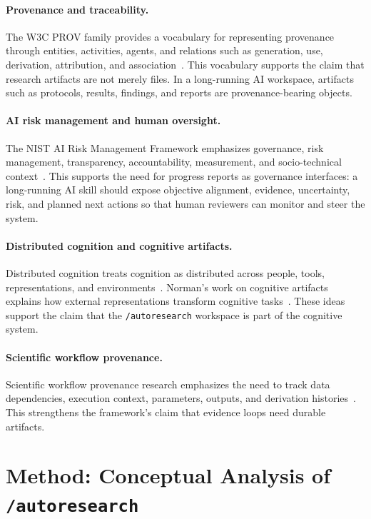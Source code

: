 \documentclass[11pt]{article}
\begin{document}
\paragraph{Provenance and traceability.}
The W3C PROV family provides a vocabulary for representing provenance through entities, activities, agents, and relations such as generation, use, derivation, attribution, and association~\cite{w3cprov2013overview,w3cprov2013dm,w3cprov2013o}. This vocabulary supports the claim that research artifacts are not merely files. In a long-running AI workspace, artifacts such as protocols, results, findings, and reports are provenance-bearing objects.

\paragraph{AI risk management and human oversight.}
The NIST AI Risk Management Framework emphasizes governance, risk management, transparency, accountability, measurement, and socio-technical context~\cite{nist2023airmf}. This supports the need for progress reports as governance interfaces: a long-running AI skill should expose objective alignment, evidence, uncertainty, risk, and planned next actions so that human reviewers can monitor and steer the system.

\paragraph{Distributed cognition and cognitive artifacts.}
Distributed cognition treats cognition as distributed across people, tools, representations, and environments~\cite{hutchins1995cognition}. Norman's work on cognitive artifacts explains how external representations transform cognitive tasks~\cite{norman1991cognitiveartifacts}. These ideas support the claim that the \texttt{/autoresearch} workspace is part of the cognitive system.

\paragraph{Scientific workflow provenance.}
Scientific workflow provenance research emphasizes the need to track data dependencies, execution context, parameters, outputs, and derivation histories~\cite{davidson2008provenanceworkflows}. This strengthens the framework's claim that evidence loops need durable artifacts.

\section{Method: Conceptual Analysis of \texttt{/autoresearch}}
\end{document}
